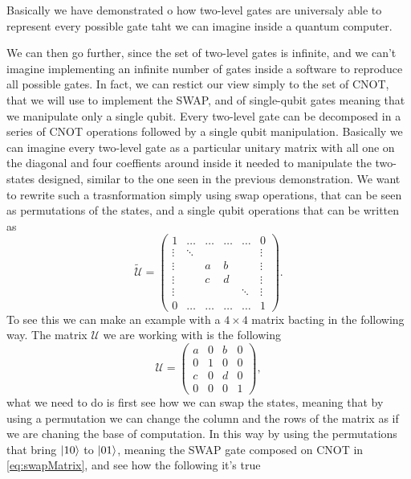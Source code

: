 \noindent
Basically we have demonstrated o how two-level gates are universaly able to represent every possible gate taht we can imagine inside a quantum computer.

We can then go further, since the set of two-level gates is infinite, and we can't imagine implementing an infinite number of gates inside a software to reproduce all possible gates. In fact, we can restict our view simply to the set of CNOT, that we will use to implement the SWAP, and of single-qubit gates meaning that we manipulate only a single qubit.
{
    Every two-level gate can be decomposed in a series of CNOT operations followed by a single qubit manipulation.
}
{
    Basically we can imagine every two-level gate as a particular unitary matrix with all one on the diagonal and four coeffients around inside it needed to manipulate the two-states designed, similar to the one seen in the previous demonstration. We want to rewrite such a trasnformation simply using swap operations, that can be seen as permutations of the states, and a single qubit operations that can be written as
    \begin{equation}
        \tilde{\mathcal{U}} = \begin{pmatrix}
            1 & \dots & \dots & \dots & \dots & 0\\
            \vdots & \ddots & & & & \vdots\\
            \vdots & & a & b & & \vdots\\
            \vdots & & c & d & & \vdots\\
            \vdots & & & & \ddots & \vdots\\
            0 & \dots & \dots & \dots &\dots & 1
        \end{pmatrix}.
    \end{equation}
    To see this we can make an example with a $4\times 4$ matrix bacting in the following way. The matrix $\mathcal{U}$ we are working with is the following 
    \begin{equation}
        \mathcal{U} = \begin{pmatrix}
            a & 0 & b & 0\\
            0 & 1 & 0 & 0\\
            c & 0 & d & 0\\
            0 & 0 & 0 & 1
        \end{pmatrix},
    \end{equation}
    what we need to do is first see how we can swap the states, meaning that by using a permutation we can change the column and the rows of the matrix as if we are chaning the base of computation. In this way by using the permutations that bring $\ket{10}$ to $\ket{01}$, meaning the SWAP gate composed on CNOT in \eqref{eq:swapMatrix}, and see how the following it's true
}
